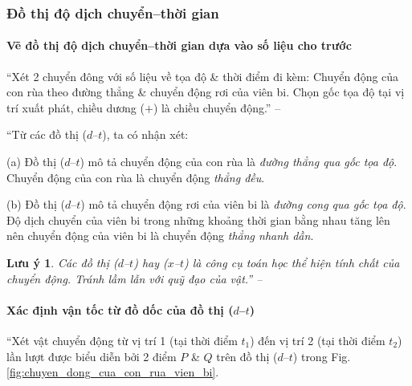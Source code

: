\documentclass{article}
\numberwithin{equation}{section}
\newtheorem{luuy}{Lưu ý}[section]
\begin{document}
\subsubsection{Đồ thị độ dịch chuyển--thời gian}

\paragraph{Vẽ đồ thị độ dịch chuyển--thời gian dựa vào số liệu cho trước}
``Xét 2 chuyển đông với số liệu về tọa độ \& thời điểm đi kèm: Chuyển động của con rùa theo đường thẳng \& chuyển động rơi của viên bi. Chọn gốc tọa độ tại vị trí xuất phát, chiều dương ($+$) là chiều chuyển động.'' -- \cite[p. 28]{SGK_Vat_Ly_10_Chan_Troi_Sang_Tao}

``Từ các đồ thị ($d$--$t$), ta có nhận xét:
\begin{enumerate*}
	\item[(a)] Đồ thị ($d$--$t$) mô tả chuyển động của con rùa là \textit{đường thẳng qua gốc tọa độ}. Chuyển động của con rùa là chuyển động \textit{thẳng đều}.
	\item[(b)] Đồ thị ($d$--$t$) mô tả chuyển động rơi của viên bi là \textit{đường cong qua gốc tọa độ}. Độ dịch chuyển của viên bi trong những khoảng thời gian bằng nhau tăng lên nên chuyển động của viên bi là chuyển động \textit{thẳng nhanh dần}.
\end{enumerate*}

\begin{luuy}
	Các đồ thị ($d$--$t$) hay ($x$--$t$) là công cụ toán học thể hiện tính chất của chuyển động. Tránh lầm lẫn với quỹ đạo của vật.'' -- \cite[p. 29]{SGK_Vat_Ly_10_Chan_Troi_Sang_Tao}
\end{luuy}

\paragraph{Xác định vận tốc từ đồ dốc của đồ thị ($d$--$t$)}
``Xét vật chuyển động từ vị trí 1 (tại thời điểm $t_1$) đến vị trí 2 (tại thời điểm $t_2$) lần lượt được biểu diễn bởi 2 điểm $P$ \& $Q$ trên đồ thị ($d$--$t$) trong Fig. \ref{fig:chuyen_dong_cua_con_rua_vien_bi}.
\end{document}
